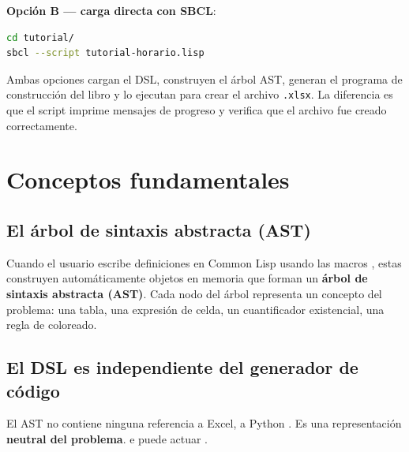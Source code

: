 \documentclass[12pt,a4paper]{report}
\begin{document}
\textbf{Opción B — carga directa con SBCL}:

\begin{lstlisting}[language=bash, numbers=none, backgroundcolor=\color{gray!10},
                   basicstyle=\ttfamily\small, keywordstyle={}]
cd tutorial/
sbcl --script tutorial-horario.lisp
\end{lstlisting}

Ambas opciones cargan el DSL, construyen el árbol AST, generan el programa
de construcción del libro y lo ejecutan para crear el archivo \texttt{.xlsx}.
La diferencia es que el script imprime mensajes de progreso y verifica que
el archivo fue creado correctamente.  


\section{Conceptos fundamentales}
\label{sec:conceptos}

\subsection{El árbol de sintaxis abstracta (AST)}

Cuando el usuario escribe definiciones en Common Lisp usando las macros , estas construyen automáticamente objetos en memoria que forman un
\textbf{árbol de sintaxis abstracta (AST)}.  Cada nodo del árbol representa
un concepto del problema: una tabla, una expresión de celda, un cuantificador
existencial, una regla de coloreado.



\subsection{El DSL es independiente del generador de código}

El AST no contiene ninguna referencia a Excel, a Python .  Es una representación \textbf{neutral del problema}.
 e 
puede actuar  .
\end{document}
